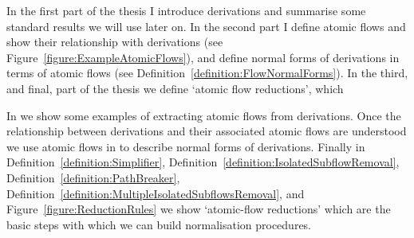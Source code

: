 In the first part of the thesis I introduce derivations and summarise some standard results we will use later on. In the second part I define atomic flows and show their relationship with derivations (see Figure~\vref{figure:ExampleAtomicFlows}), and define normal forms of derivations in terms of atomic flows (see Definition~\vref{definition:FlowNormalForms}). In the third, and final, part of the thesis we define `atomic flow reductions', which 

In  we show some examples of extracting atomic flows from derivations. Once the relationship between derivations and their associated atomic flows are understood we use atomic flows in  to describe normal forms of derivations. Finally in Definition~\vref{definition:Simplifier}, Definition~\vref{definition:IsolatedSubflowRemoval}, Definition~\vref{definition:PathBreaker}, Definition~\vref{definition:MultipleIsolatedSubflowsRemoval}, and Figure~\vref{figure:ReductionRules} we show `atomic-flow reductions' which are the basic steps with which we can build normalisation procedures.